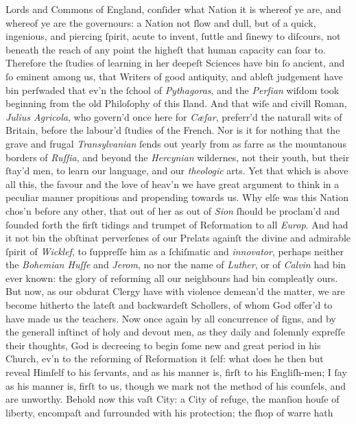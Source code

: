 Lords and Commons of England, conſider what Nation it is whereof ye are, and
whereof ye are the governours: a Nation not ſlow and dull, but of a quick,
ingenious, and piercing ſpirit, acute to invent, ſuttle and ſinewy to diſcours,
not beneath the reach of any point the higheſt that human capacity can ſoar to.
Therefore the ſtudies of learning in her deepeſt Sciences have bin ſo ancient,
and ſo eminent among us, that Writers of good antiquity, and ableſt judgement
have bin perſwaded that ev'n the ſchool of \textit{Pythagoras}, and the
\textit{Perſian} wiſdom took beginning from the old Philoſophy of this Iland.
And that wiſe and civill Roman, \textit{Julius Agricola}, who govern'd once here
for \textit{Cæſar}, preferr'd the naturall wits of Britain, before the labour'd
ſtudies of the French.  Nor is it for nothing that the grave and frugal
\textit{Transylvanian} ſends out yearly from as farre as the mountanous borders
of \textit{Ruſſia}, and beyond the \textit{Hercynian} wildernes, not their
youth, but their ſtay'd men, to learn our language, and our \textit{theologic}
arts.  Yet that which is above all this, the favour and the love of heav'n we
have great argument to think in a peculiar manner propitious and propending
towards us.  Why elſe was this Nation chos'n before any other, that out of her
as out of \textit{Sion} ſhould be proclam'd and ſounded forth the firſt tidings
and trumpet of Reformation to all \textit{Europ}.  And had it not bin the
obſtinat perverſenes of our Prelats againſt the divine and admirable ſpirit of
\textit{Wicklef}, to ſuppreſſe him as a ſchiſmatic and \textit{innovator},
perhaps neither the \textit{Bohemian Huſſe} and \textit{Jerom}, no nor the name
of \textit{Luther}, or of \textit{Calvin} had bin ever known: the glory of
reforming all our neighbours had bin compleatly ours.  But now, as our obdurat
Clergy have with violence demean'd the matter, we are become hitherto the lateſt
and backwardeſt Schollers, of whom God offer'd to have made us the teachers.
Now once again by all concurrence of ſigns, and by the generall inſtinct of holy
and devout men, as they daily and ſolemnly expreſſe their thoughts, God is
decreeing to begin ſome new and great period in his Church, ev'n to the
reforming of Reformation it ſelf: what does he then but reveal Himſelf to his
ſervants, and as his manner is, firſt to his Engliſh-men; I ſay as his manner
is, firſt to us, though we mark not the method of his counſels, and are
unworthy.  Behold now this vaſt City: a City of refuge, the manſion houſe of
liberty, encompaſt and ſurrounded with his protection; the ſhop of warre hath

